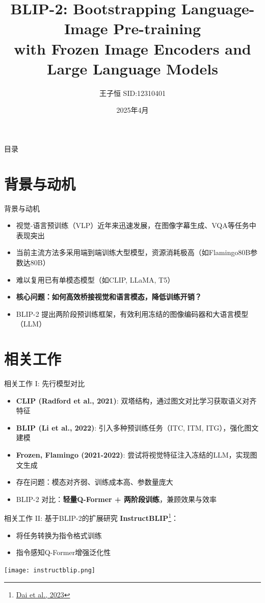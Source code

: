 \documentclass{beamer}
\title[BLIP-2 Presentation]{BLIP-2: Bootstrapping Language-Image Pre-training\\with Frozen Image Encoders and Large Language Models}
\author{王子恒 \newline SID:12310401}
\institute{SUSTech \newline CS308 Computer Vision \newline 期中论文汇报}
\date{2025年4月}
\begin{document}
\begin{frame}
  \titlepage
\end{frame}

\begin{frame}{目录}
  \tableofcontents
\end{frame}

\section{背景与动机}
\begin{frame}{背景与动机}
  \begin{itemize}
    \item 视觉-语言预训练（VLP）近年来迅速发展，在图像字幕生成、VQA等任务中表现突出
    \item 当前主流方法多采用端到端训练大型模型，资源消耗极高（如Flamingo80B参数达80B）
    \item 难以复用已有单模态模型（如CLIP, LLaMA, T5）
    \item \textbf{核心问题：如何高效桥接视觉和语言模态，降低训练开销？}
    \item BLIP-2 提出两阶段预训练框架，有效利用冻结的图像编码器和大语言模型（LLM）
  \end{itemize}
\end{frame}

\section{相关工作}
\begin{frame}{相关工作 I: 先行模型对比}
  \begin{itemize}
    \item \textbf{CLIP (Radford et al., 2021)}: 双塔结构，通过图文对比学习获取语义对齐特征
    \item \textbf{BLIP (Li et al., 2022)}: 引入多种预训练任务（ITC, ITM, ITG），强化图文建模
    \item \textbf{Frozen, Flamingo (2021-2022)}: 尝试将视觉特征注入冻结的LLM，实现图文生成
    \item 存在问题：模态对齐弱、训练成本高、参数量庞大
    \item BLIP-2 对比：\textbf{轻量Q-Former + 两阶段训练}，兼顾效果与效率
  \end{itemize}
\end{frame}

\begin{frame}{相关工作 II: 基于BLIP-2的扩展研究}
  \textbf{InstructBLIP}\footnote{\href{https://arxiv.org/abs/2305.06500}{Dai et al., 2023}}：
  \begin{itemize}
    \item 将任务转换为指令格式训练
    \item 指令感知Q-Former增强泛化性
  \end{itemize}
  \texttt{[image: instructblip.png]}
  \vspace{1mm}
  
\end{frame}
\end{document}
